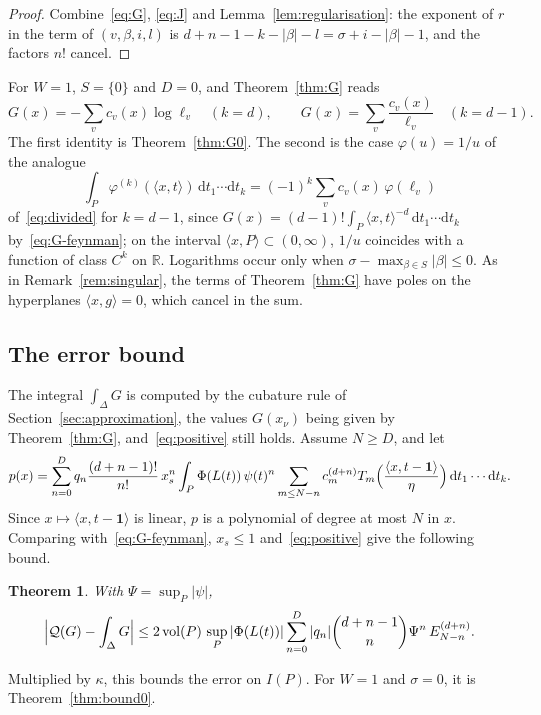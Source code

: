 \documentclass[11pt]{article}
\newtheorem{theorem}{Theorem}[section]
\theoremstyle{remark}
\newcommand{\R}{\mathbb{R}}
\newcommand{\scal}[2]{\langle #1, #2\rangle}
\newcommand{\vol}{\operatorname{vol}}
\newcommand{\one}{\mathbf{1}}
\newcommand{\dd}{\mathrm{d}}
\begin{document}
\begin{proof}
Combine~\eqref{eq:G}, \eqref{eq:J} and Lemma~\ref{lem:regularisation}: the
exponent of $r$ in the term of $(v, \beta, i, l)$ is $d + n - 1 - k - |\beta|
- l = \sigma + i - |\beta| - 1$, and the factors $n!$ cancel.
\end{proof}

For $W = 1$, $S = \{0\}$ and $D = 0$, and Theorem~\ref{thm:G} reads
\[
  G(x) = -\sum_v c_v(x) \log \ell_v \quad (k = d), \qquad
  G(x) = \sum_v \frac{c_v(x)}{\ell_v} \quad (k = d - 1).
\]
The first identity is Theorem~\ref{thm:G0}. The second is the case
$\varphi(u) = 1/u$ of the analogue
\[
  \int_P \varphi^{(k)}(\scal{x}{t}) \, \dd t_1 \cdots \dd t_k
  = (-1)^k \sum_v c_v(x) \, \varphi(\ell_v)
\]
of~\eqref{eq:divided} for $k = d - 1$, since $G(x) = (d-1)! \int_P
\scal{x}{t}^{-d} \, \dd t_1 \cdots \dd t_k$ by~\eqref{eq:G-feynman}; on the
interval $\scal{x}{P} \subset (0, \infty)$, $1/u$ coincides with a function
of class $C^k$ on $\R$. Logarithms occur only when $\sigma - \max_{\beta \in
S} |\beta| \leq 0$. As in Remark~\ref{rem:singular}, the terms of
Theorem~\ref{thm:G} have poles on the hyperplanes $\scal{x}{g} = 0$, which
cancel in the sum.

\subsection{The error bound}

The integral $\int_\Delta G$ is computed by the cubature rule of
Section~\ref{sec:approximation}, the values $G(x_\nu)$ being given by
Theorem~\ref{thm:G}, and~\eqref{eq:positive} still holds. Assume $N \geq D$,
and let
\[
  p(x) = \sum_{n=0}^{D} q_n \frac{(d+n-1)!}{n!} \, x_s^n \int_P \Phi(L(t))
  \, \psi(t)^n \sum_{m \leq N - n} c^{(d+n)}_m T_m\Bigl(
  \frac{\scal{x}{t - \one}}{\eta} \Bigr) \, \dd t_1 \cdots \dd t_k.
\]
Since $x \mapsto \scal{x}{t - \one}$ is linear, $p$ is a polynomial of
degree at most $N$ in $x$. Comparing with~\eqref{eq:G-feynman}, $x_s \leq
1$ and~\eqref{eq:positive} give the following bound.

\begin{theorem}\label{thm:bound}
With $\Psi = \sup_P |\psi|$,
\[
  \Bigl| \mathcal{Q}(G) - \int_\Delta G \Bigr|
  \leq 2 \vol(P) \, \sup_P |\Phi(L(t))| \sum_{n=0}^{D} |q_n|
    \binom{d + n - 1}{n} \Psi^n \, E^{(d+n)}_{N-n}.
\]
\end{theorem}

Multiplied by $\kappa$, this bounds the error on $I(P)$. For $W = 1$ and
$\sigma = 0$, it is Theorem~\ref{thm:bound0}.
\end{document}
